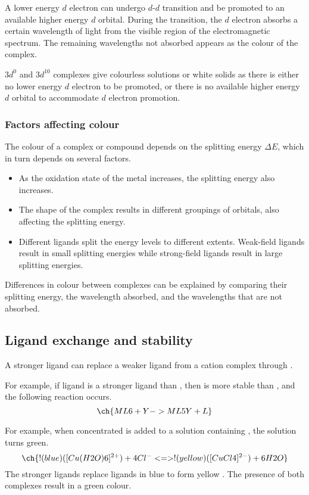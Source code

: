 \documentclass[Chemistry.tex]{subfiles}
\begin{document}
A lower energy \(d\) electron can undergo \(d\)-\(d\) transition and be promoted to an available higher energy \(d\) orbital. During the transition, the \(d\) electron absorbs a certain wavelength of light from the visible region of the electromagnetic spectrum. The remaining wavelengths not absorbed appears as the colour of the complex.

\(3d^0\) and \(3d^{10}\) complexes give colourless solutions or white solids as there is either no lower energy \(d\) electron to be promoted, or there is no available higher energy \(d\) orbital to accommodate \(d\) electron promotion.
\subsubsection{Factors affecting colour}
The colour of a complex or compound depends on the splitting energy \(\Delta E\), which in turn depends on several factors. \begin{itemize}
\item As the oxidation state of the metal increases, the splitting energy also increases.
\item The shape of the complex results in different groupings of orbitals, also affecting the splitting energy.
\item Different ligands split the energy levels to different extents. Weak-field ligands result in small splitting energies while strong-field ligands result in large splitting energies.
\end{itemize}

Differences in colour between complexes can be explained by comparing their splitting energy, the wavelength absorbed, and the wavelengths that are not absorbed.
\subsection{Ligand exchange and stability}
A stronger ligand can replace a weaker ligand from a cation complex through .

For example, if ligand  is a stronger ligand than , then  is more stable than , and the following reaction occurs. \[\ch{ML6 + Y -> ML5Y + L}\]

For example, when concentrated  is added to a solution containing , the solution turns green. \[\ch{!(blue)( [Cu(H2O)6]^{2+} ) + 4 Cl^- <=> !(yellow)( [CuCl4]^{2-} ) + 6 H2O}\] The stronger  ligands replace  ligands in blue  to form yellow . The presence of both complexes result in a green colour.
\end{document}
